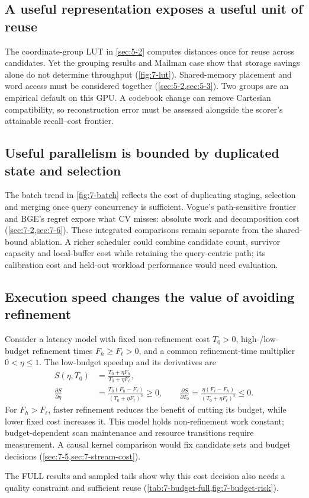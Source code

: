 \subsection{A useful representation exposes a useful unit of reuse}

The coordinate-group LUT in \cref{sec:5-2} computes distances once for
reuse across candidates. Yet the grouping results and Mailman case show
that storage savings alone do not determine throughput (\cref{fig:7-lut}).
Shared-memory placement and word access must be considered together
(\cref{sec:5-2,sec:5-3}). Two groups are an empirical default on this GPU.
A codebook change can remove Cartesian compatibility, so reconstruction
error must be assessed alongside the scorer's attainable recall--cost
frontier.

\subsection{Useful parallelism is bounded by duplicated state and selection}

The batch trend in \cref{fig:7-batch} reflects the cost of duplicating
staging, selection and merging once query concurrency is sufficient.
Vogue's path-sensitive frontier and BGE's regret expose what CV misses:
absolute work and decomposition cost (\cref{sec:7-2,sec:7-6}). These
integrated comparisons remain separate from the shared-bound ablation.
A richer scheduler could combine candidate count, survivor capacity and
local-buffer cost while retaining the query-centric path; its calibration
cost and held-out workload performance would need evaluation.

\subsection{Execution speed changes the value of avoiding refinement}

Consider a latency model with fixed non-refinement cost $T_0>0$,
high-/low-budget refinement times $F_h\geq F_\ell>0$, and a common
refinement-time multiplier $0<\eta\leq1$. The low-budget speedup and
its derivatives are
\begin{align}
 S(\eta,T_0)&=\frac{T_0+\eta F_h}{T_0+\eta F_\ell},
 \label{eq:8-refinement-sensitivity}\\
 \frac{\partial S}{\partial\eta}
 &=\frac{T_0(F_h-F_\ell)}{(T_0+\eta F_\ell)^2}\geq0,\qquad
 \frac{\partial S}{\partial T_0}
 =\frac{\eta(F_\ell-F_h)}{(T_0+\eta F_\ell)^2}\leq0.\nonumber
\end{align}
For $F_h>F_\ell$, faster refinement reduces the benefit of cutting its budget, while
lower fixed cost increases it. This model holds non-refinement work
constant; budget-dependent scan maintenance and resource transitions
require measurement. A causal kernel comparison would fix candidate sets
and budget decisions (\cref{sec:7-5,sec:7-stream-cost}).

The FULL results and sampled tails show why this cost decision also
needs a quality constraint and sufficient reuse
(\cref{tab:7-budget-full,fig:7-budget-risk}).
